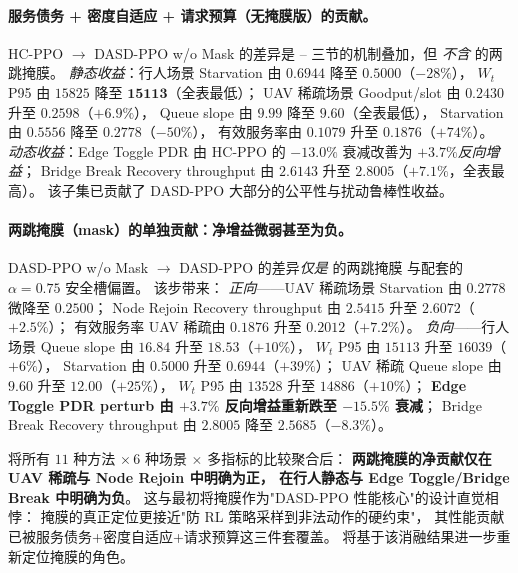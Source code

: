 \paragraph{服务债务 + 密度自适应 + 请求预算（无掩膜版）的贡献。}
HC-PPO \(\rightarrow\) DASD-PPO w/o Mask 的差异是 --
三节的机制叠加，但 \emph{不含}  的两跳掩膜。
\emph{静态收益}：行人场景 Starvation 由 \(0.6944\) 降至 \(\mathbf{0.5000}\)（\(-28\%\)），
\(W_t\) P95 由 \(15825\) 降至 \(\mathbf{15113}\)（全表最低）；
UAV 稀疏场景 Goodput/slot 由 \(0.2430\) 升至 \(0.2598\)（\(+6.9\%\)），
Queue slope 由 \(9.99\) 降至 \(\mathbf{9.60}\)（全表最低），
Starvation 由 \(0.5556\) 降至 \(0.2778\)（\(-50\%\)），
有效服务率由 \(0.1079\) 升至 \(0.1876\)（\(+74\%\)）。
\emph{动态收益}：Edge Toggle PDR 由 HC-PPO 的 \(-13.0\%\) 衰减改善为 \(+3.7\%\)\emph{反向增益}；
Bridge Break Recovery throughput 由 \(2.6143\) 升至 \(\mathbf{2.8005}\)（\(+7.1\%\)，全表最高）。
该子集已贡献了 DASD-PPO 大部分的公平性与扰动鲁棒性收益。

\paragraph{两跳掩膜（mask）的单独贡献：净增益微弱甚至为负。}
DASD-PPO w/o Mask \(\rightarrow\) DASD-PPO 的差异\emph{仅是}  的两跳掩膜
与配套的 \(\alpha=0.75\) 安全槽偏置。
该步带来：
\emph{正向}——UAV 稀疏场景 Starvation 由 \(0.2778\) 微降至 \(0.2500\)；
Node Rejoin Recovery throughput 由 \(2.5415\) 升至 \(2.6072\)（\(+2.5\%\)）；
有效服务率 UAV 稀疏由 \(0.1876\) 升至 \(0.2012\)（\(+7.2\%\)）。
\emph{负向}——行人场景 Queue slope 由 \(16.84\) 升至 \(18.53\)（\(+10\%\)），
\(W_t\) P95 由 \(15113\) 升至 \(16039\)（\(+6\%\)），
Starvation 由 \(0.5000\) 升至 \(0.6944\)（\(+39\%\)）；
UAV 稀疏 Queue slope 由 \(9.60\) 升至 \(12.00\)（\(+25\%\)），
\(W_t\) P95 由 \(13528\) 升至 \(14886\)（\(+10\%\)）；
\textbf{Edge Toggle PDR perturb 由 \(+3.7\%\) 反向增益重新跌至 \(-15.5\%\) 衰减}；
Bridge Break Recovery throughput 由 \(\mathbf{2.8005}\) 降至 \(2.5685\)（\(-8.3\%\)）。

将所有 \(11\) 种方法 \(\times\,6\) 种场景 \(\times\) 多指标的比较聚合后：
\textbf{两跳掩膜的净贡献仅在 UAV 稀疏与 Node Rejoin 中明确为正，
在行人静态与 Edge Toggle/Bridge Break 中明确为负}。
这与最初将掩膜作为"DASD-PPO 性能核心"的设计直觉相悖：
掩膜的真正定位更接近"防 RL 策略采样到非法动作的硬约束"，
其性能贡献已被服务债务+密度自适应+请求预算这三件套覆盖。
 将基于该消融结果进一步重新定位掩膜的角色。
